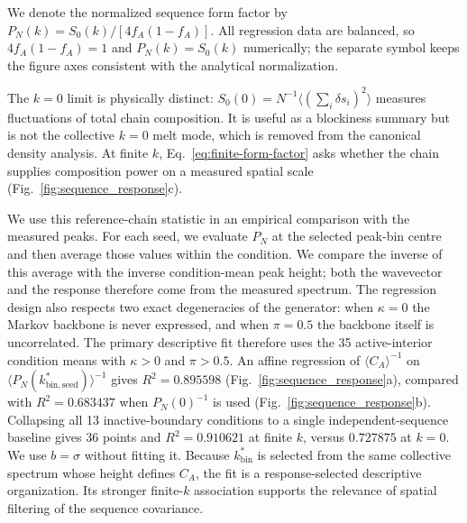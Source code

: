 \documentclass[pdflatex,sn-nature,onecolumn]{sn-jnl}
\begin{document}
We denote the normalized sequence form factor by $P_N(k)=S_0(k)/[4f_A(1-f_A)]$. All regression data are balanced, so $4f_A(1-f_A)=1$ and $P_N(k)=S_0(k)$ numerically; the separate symbol keeps the figure axes consistent with the analytical normalization.

The $k=0$ limit is physically distinct: $S_0(0)=N^{-1}\langle(\sum_i\delta s_i)^2\rangle$ measures fluctuations of total chain composition. It is useful as a blockiness summary but is not the collective $k=0$ melt mode, which is removed from the canonical density analysis. At finite $k$, Eq.~\ref{eq:finite-form-factor} asks whether the chain supplies composition power on a measured spatial scale (Fig.~\ref{fig:sequence_response}c).

We use this reference-chain statistic in an empirical comparison with the measured peaks. For each seed, we evaluate $P_N$ at the selected peak-bin centre and then average those values within the condition. We compare the inverse of this average with the inverse condition-mean peak height; both the wavevector and the response therefore come from the measured spectrum. The regression design also respects two exact degeneracies of the generator: when $\kappa=0$ the Markov backbone is never expressed, and when $\pi=0.5$ the backbone itself is uncorrelated. The primary descriptive fit therefore uses the 35 active-interior condition means with $\kappa>0$ and $\pi>0.5$. An affine regression of $\langle C_A\rangle^{-1}$ on $\langle P_N(k_{\mathrm{bin,seed}}^*)\rangle^{-1}$ gives $R^2=0.895598$ (Fig.~\ref{fig:sequence_response}a), compared with $R^2=0.683437$ when $P_N(0)^{-1}$ is used (Fig.~\ref{fig:sequence_response}b). Collapsing all 13 inactive-boundary conditions to a single independent-sequence baseline gives 36 points and $R^2=0.910621$ at finite $k$, versus $0.727875$ at $k=0$. We use $b=\sigma$ without fitting it. Because $k_{\mathrm{bin}}^*$ is selected from the same collective spectrum whose height defines $C_A$, the fit is a response-selected descriptive organization. Its stronger finite-$k$ association supports the relevance of spatial filtering of the sequence covariance.
\end{document}
